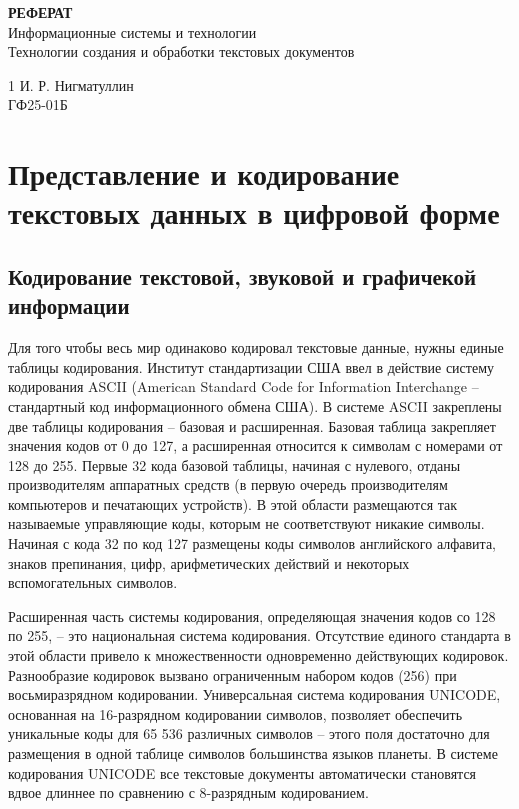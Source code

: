 \documentclass{ou}
\begin{document}
\thispagestyle{empty}
\begin{center}
\shortstack{\FGAVO}
\vfill
{}
\textbf{РЕФЕРАТ}\\
Информационные системы и технологии\\
Технологии создания и обработки текстовых документов
\vfill
\end{center}
\thispagestyle{empty}
\vspace{-12pt}
\begin{spacing}{1}
\noindent\instructor \hfill И. Р. Нигматуллин\\
\students \hfill ГФ25-01Б\\
\end{spacing}
\begin{center}
    \city
\end{center}
\newpage
\tableofcontents
\newpage
\section{Представление и кодирование текстовых данных в цифровой форме}
\subsection{Кодирование текстовой, звуковой и графичекой информации}
Для того чтобы весь мир одинаково кодировал текстовые данные, нужны единые таблицы кодирования. Институт стандартизации США ввел в действие систему кодирования ASCII (American Standard Code for Information Interchange -- стандартный код информационного обмена США). В системе ASCII закреплены две таблицы кодирования -- базовая и расширенная. Базовая таблица закрепляет значения кодов от 0 до 127, а расширенная относится к символам с номерами от 128 до 255. Первые 32 кода базовой таблицы, начиная с нулевого, отданы производителям аппаратных средств (в первую очередь производителям компьютеров и печатающих устройств). В этой области размещаются так называемые управляющие коды, которым не соответствуют никакие символы. Начиная с кода 32 по код 127 размещены коды символов английского алфавита, знаков препинания, цифр, арифметических действий и некоторых вспомогательных символов. 

Расширенная часть системы кодирования, определяющая значения кодов со 128 по 255, -- это национальная система кодирования. Отсутствие единого стандарта в этой области привело к множественности одновременно действующих кодировок. Разнообразие кодировок вызвано ограниченным набором кодов (256) при восьмиразрядном кодировании. Универсальная система кодирования UNICODE, основанная на 16-разрядном кодировании символов, позволяет обеспечить уникальные коды для 65 536 различных символов -- этого поля достаточно для размещения в одной таблице символов большинства языков планеты. В системе кодирования UNICODE все текстовые документы автоматически становятся вдвое длиннее по сравнению с 8-разрядным кодированием. 
\end{document}
